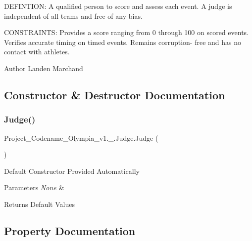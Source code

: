 D\+E\+F\+I\+N\+T\+I\+ON\+: A qualified person to score and assess each event. A judge is independent of all teams and free of any bias.

C\+O\+N\+S\+T\+R\+A\+I\+N\+TS\+: Provides a score ranging from 0 through 100 on scored events. Verifies accurate timing on timed events. Remains corruption-\/ free and has no contact with athletes.\begin{DoxyAuthor}{Author}
Landen Marchand 
\end{DoxyAuthor}


\subsection{Constructor \& Destructor Documentation}
\mbox{\label{classProject__Codename__Olympia__v1_1_1__0_1_1Judge_a9960078c62261a1ed3b91297fcd8ef92}} 
\subsubsection{\texorpdfstring{Judge()}{Judge()}}
{\footnotesize\ttfamily Project\+\_\+\+Codename\+\_\+\+Olympia\+\_\+v1.\+\_.\+Judge.\+Judge (\begin{DoxyParamCaption}{ }\end{DoxyParamCaption})\hspace{0.3cm}{\ttfamily [inline]}}

Default Constructor Provided Automatically 
\begin{DoxyParams}{Parameters}
{\em None} & \\
\hline
\end{DoxyParams}
\begin{DoxyReturn}{Returns}
Default Values 
\end{DoxyReturn}


\subsection{Property Documentation}
\mbox{\label{classProject__Codename__Olympia__v1_1_1__0_1_1Judge_a7cdcda330f37b5615e86a6988a7f4738}} 
